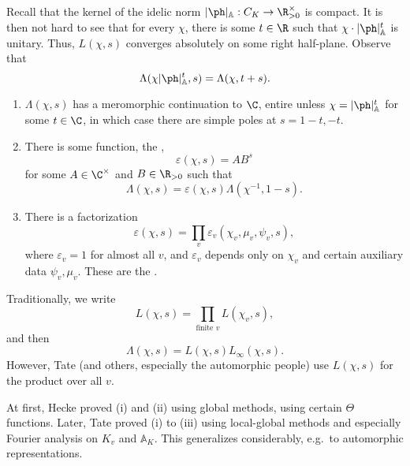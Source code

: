 \documentclass[a4paper]{article}
\newcommand\A{\mathbb{A}}
\begin{document}
Recall that the kernel of the idelic norm $|\ph|_\A: C_K \to \R^\times_{>0}$ is compact. It is then not hard to see that for every $\chi$, there is some $t \in \R$ such that $\chi \cdot |\ph|_\A^t$ is unitary. Thus, $L(\chi, s)$ converges absolutely on some right half-plane. Observe that
\[
  \Lambda(\chi |\ph|_\A^t, s) = \Lambda(\chi, t + s).
\]
\begin{thm}\leavevmode
  \begin{enumerate}
    \item $\Lambda(\chi, s)$ has a meromorphic continuation to $\C$, entire unless $\chi = |\ph|_\A^t$ for some $t \in \C$, in which case there are simple poles at $s = 1 - t, -t$.
    \item There is some function, the ,
      \[
        \varepsilon(\chi, s) = A B^s
      \]
      for some $A \in \C^\times$ and $B \in \R_{>0}$ such that
      \[
        \Lambda(\chi, s) = \varepsilon(\chi, s) \Lambda(\chi^{-1}, 1 - s).
      \]
    \item There is a factorization
      \[
        \varepsilon(\chi, s) = \prod_v \varepsilon_v(\chi_v, \mu_v, \psi_v, s),
      \]
      where $\varepsilon_v = 1$ for almost all $v$, and $\varepsilon_v$ depends only on $\chi_v$ and certain auxiliary data $\psi_v, \mu_v$. These are the .
  \end{enumerate}
\end{thm}
Traditionally, we write
\[
  L(\chi, s) = \prod_{\text{finite } v} L(\chi_v, s),
\]
and then
\[
  \Lambda(\chi, s) = L(\chi, s) L_\infty(\chi, s).
\]
However, Tate (and others, especially the automorphic people) use $L(\chi, s)$ for the product over all $v$.

At first, Hecke proved (i) and (ii) using global methods, using certain $\Theta$ functions. Later, Tate proved (i) to (iii) using local-global methods and especially Fourier analysis on $K_v$ and $\A_K$. This generalizes considerably, e.g.\ to automorphic representations.
\end{document}
